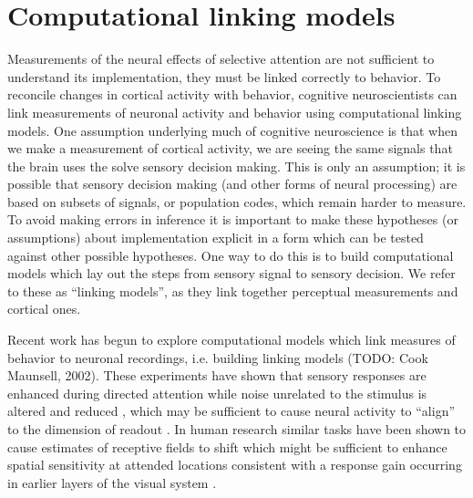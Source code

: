 \section{Computational linking models}

Measurements of the neural effects of selective attention are not sufficient to understand its implementation, they must be linked correctly to behavior. To reconcile changes in cortical activity with behavior, cognitive neuroscientists can link measurements of neuronal activity and behavior using computational linking models. One assumption underlying much of cognitive neuroscience is that when we make a measurement of cortical activity, we are seeing the same signals that the brain uses the solve sensory decision making. This is only an assumption; it is possible that sensory decision making (and other forms of neural processing) are based on subsets of signals, or population codes, which remain harder to measure. To avoid making errors in inference it is important to make these hypotheses (or assumptions) about implementation explicit in a form which can be tested against other possible hypotheses. One way to do this is to build computational models which lay out the steps from sensory signal to sensory decision. We refer to these as “linking models”, as they link together perceptual measurements and cortical ones. 

Recent work has begun to explore computational models which link measures of behavior to neuronal recordings, i.e. building linking models \citep{Barlow1972-kz,Brindley1960-gq,Cohen2010-xs,Newsome1989-fr,Pestilli2011-gi} (TODO: Cook Maunsell, 2002). These experiments have shown that sensory responses are enhanced during directed attention while noise unrelated to the stimulus is altered and reduced \citep{Ecker2016-ro,Rabinowitz2015-uz,Snyder2018-yr}, which may be sufficient to cause neural activity to ``align'' to the dimension of readout \citep{Ruff2018-yx}. In human research similar tasks have been shown to cause estimates of receptive fields to shift \citep{Klein2014-oe} which might be sufficient to enhance spatial sensitivity at attended locations \citep{Klein2016-ox,Vo2017-oi} consistent with a response gain occurring in earlier layers of the visual system \citep{Baruch2014-gy,Miconi2016-ip}.
 
